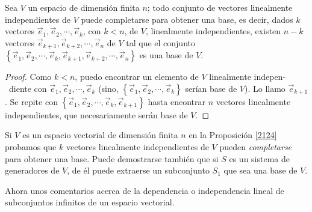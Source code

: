 \begin{theorem}
\label{2124}

Sea $V$ un espacio de dimensión finita $n$; todo conjunto de vectores linealmente independientes de $V$ puede completarse para obtener una base, es decir, dados $k$ vectores $\vec{e}_1,\vec{e}_2,\cdots, \vec{e}_k$, con $k<n$, de $V$, linealmente independientes, existen $n-k$ vectores $\vec{e}_{k+1},\vec{e}_{k+2},\cdots, \vec{e}_n$ de $V$ tal que el conjunto $\left\{\vec{e}_1,\vec{e}_2,\cdots, \vec{e}_k,\vec{e}_{k+1},\vec{e}_{k+2},\cdots, \vec{e}_n\right\}$ es una base de $V$.

\bigskip

\begin{proof}
Como $k<n$, puedo encontrar un elemento de $V$  linealmente indepen-\ diente con  $\vec{e}_1,\vec{e}_2,\cdots, \vec{e}_k$ (sino,  $ \left\{\vec{e}_1,\vec{e}_2,\cdots, \vec{e}_k  \right\}$ serían base de $V$). Lo llamo $\vec{e}_{k+1}$. Se repite con $ \left\{\vec{e}_1,\vec{e}_2,\cdots, \vec{e}_k, \vec{e}_{k+1}  \right\}$ hasta encontrar $n$ vectores linealmente independientes, que necesariamente serán base de $V$.
\end{proof}
\end{theorem}

\bigskip

\noindent
Si $V$ es un espacio vectorial de dimensión finita $n$ en la Proposición \ref{2124} probamos  que $k$ vectores linealmente independientes de $V$ pueden \textit{completarse} para obtener una base. Puede demostrarse también  que si $S$ es un sistema de generadores de $V$, de él puede extraerse un subconjunto $S_1$ que sea una base de $V$.

\bigskip
\noindent
Ahora unos comentarios acerca de la dependencia o independencia lineal de subconjuntos infinitos de un espacio  vectorial.

\bigskip

